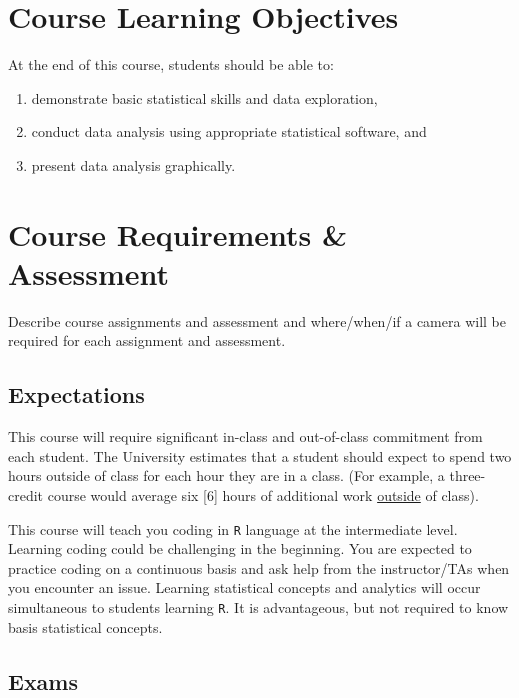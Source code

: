 \documentclass[11pt,]{article}
\providecommand{\tightlist}{%
  \setlength{\itemsep}{0pt}\setlength{\parskip}{0pt}}
\begin{document}
\hypertarget{course-learning-objectives}{%
\section{Course Learning Objectives}\label{course-learning-objectives}}

At the end of this course, students should be able to:

\begin{enumerate}
\def\labelenumi{\arabic{enumi}.}
\tightlist
\item
  demonstrate basic statistical skills and data exploration,
\item
  conduct data analysis using appropriate statistical software, and
\item
  present data analysis graphically.
\end{enumerate}

\hypertarget{course-requirements-assessment}{%
\section{Course Requirements \&
Assessment}\label{course-requirements-assessment}}

Describe course assignments and assessment and where/when/if a camera
will be required for each assignment and assessment.

\hypertarget{expectations}{%
\subsection{Expectations}\label{expectations}}

This course will require significant in-class and out-of-class
commitment from each student. The University estimates that a student
should expect to spend two hours outside of class for each hour they are
in a class. (For example, a three-credit course would average six
{[}6{]} hours of additional work \underline{outside} of class).

This course will teach you coding in \texttt{R} language at the
intermediate level. Learning coding could be challenging in the
beginning. You are expected to practice coding on a continuous basis and
ask help from the instructor/TAs when you encounter an issue. Learning
statistical concepts and analytics will occur simultaneous to students
learning \texttt{R}. It is advantageous, but not required to know basis
statistical concepts.

\hypertarget{exams}{%
\subsection{Exams}\label{exams}}
\end{document}
